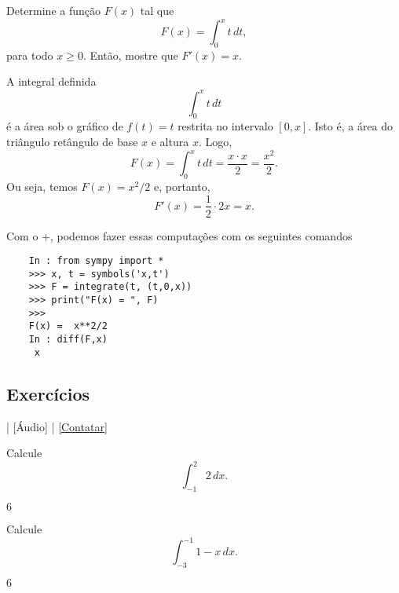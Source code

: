 \begin{exeresol}
  Determine a função $F(x)$ tal que
  \begin{equation}
    F(x) = \int_0^x t\,dt,
  \end{equation}
  para todo $x\geq 0$. Então, mostre que $F'(x) = x$.
\end{exeresol}
\begin{resol}
  A integral definida
  \begin{equation}
    \int_0^x t\,dt
  \end{equation}
  é a área sob o gráfico de $f(t) = t$ restrita no intervalo $[0, x]$. Isto é, a área do triângulo retângulo de base $x$ e altura $x$. Logo,
  \begin{equation}
    F(x) = \int_0^x t\,dt = \frac{x\cdot x}{2} = \frac{x^2}{2}.
  \end{equation}
  Ou seja, temos $F(x) = x^2/2$ e, portanto,
  \begin{equation}
    F'(x) = \frac{1}{2}\cdot 2x = x.
  \end{equation}

  \ifispython
  Com o {\python}+{\sympy}, podemos fazer essas computações com os seguintes comandos
  \begin{lstlisting}
    In : from sympy import *
    >>> x, t = symbols('x,t')
    >>> F = integrate(t, (t,0,x))
    >>> print("F(x) = ", F)
    >>> 
    F(x) =  x**2/2
    In : diff(F,x)
     x
  \end{lstlisting}
  \fi  
\end{resol}

\subsection{Exercícios}

\begin{flushright}
  [Vídeo] | [Áudio] | \href{https://phkonzen.github.io/notas/contato.html}{[Contatar]}
\end{flushright}

\begin{exer}
  Calcule
  \begin{equation}
    \int_{-1}^2 2\,dx.
  \end{equation}
\end{exer}
\begin{resp}
  $6$
\end{resp}

\begin{exer}
  Calcule
  \begin{equation}
    \int_{-3}^{-1} 1-x\,dx.
  \end{equation}
\end{exer}
\begin{resp}
  $6$
\end{resp}

